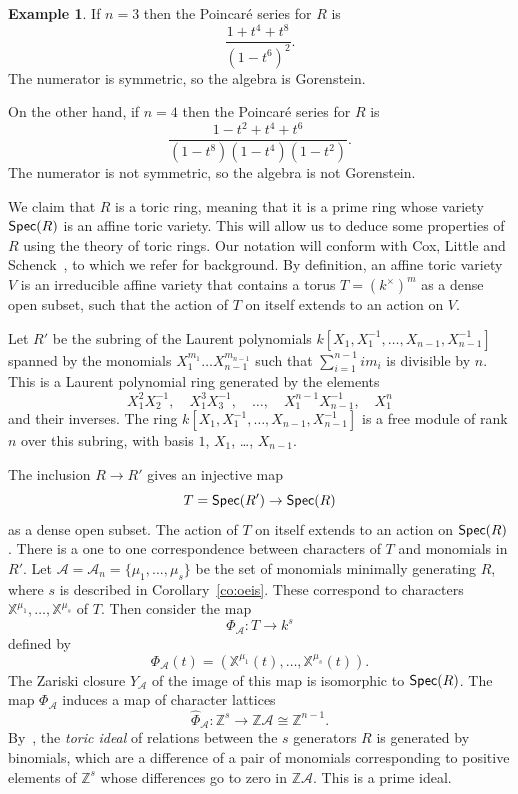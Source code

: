 \documentclass[12pt]{amsart}
\newcommand{\Spec}{\operatorname{\sf Spec}}
\newcommand{\bX}{\mathbb{X}}
\newcommand{\bZ}{{\mathbb{Z}}}
\newcommand{\mcA}{\mathcal{A}}
\numberwithin{equation}{section}
\theoremstyle{definition}
\newtheorem{example}[equation]{Example}
\begin{document}
\begin{example}
If $n=3$ then the Poincar\'e series for $R$ is
\[ \frac{1+t^4+t^8}{(1-t^6)^2}. \]
The numerator is symmetric, so the algebra is Gorenstein. 

On the other
hand, if $n=4$ then the Poincar\'e series for $R$ is
\[ \frac{1-t^2+t^4+t^6}{(1-t^8)(1-t^4)(1-t^2)}. \]
The numerator is not symmetric, so the algebra is not Gorenstein.
\end{example}

We claim that $R$ is a toric ring, meaning that it is a prime ring
whose variety $\Spec(R)$ is an affine toric variety. This will allow
us to deduce some properties of $R$ using the theory of toric
rings. Our notation will conform with Cox, Little
and Schenck~\cite{Cox/Little/Schenck:2011a}, to which we refer for
background. By definition, an 
affine toric variety $V$ is an irreducible affine variety that
contains a torus $T=(k^\times)^m$ as a dense open subset, such that
the action of $T$ on itself extends to an action on $V$.

Let $R'$ be the subring of the Laurent polynomials
$k[X_1,X_1^{-1},\dots,X_{n-1},X_{n-1}^{-1}]$ spanned by the monomials
$X_1^{m_1}\dots X_{n-1}^{m_{n-1}}$ such that $\sum_{i=1}^{n-1}im_i$ is
divisible by $n$. This is a Laurent polynomial ring generated by the
elements 
\begin{equation}
X_1^2X_2^{-1},\quad X_1^3X_3^{-1},\quad \dots,\quad
X_1^{n-1}X_{n-1}^{-1},\quad X_1^n 
\end{equation}
and their inverses. The ring
$k[X_1,X_1^{-1},\dots,X_{n-1},X_{n-1}^{-1}]$ is a free module of rank
$n$ over this subring, with basis $1$, $X_1$, \dots, $X_{n-1}$.


The inclusion $R\to R'$ gives an injective map 
\[ T=\Spec(R') \to \Spec(R) \] 
as a dense
open subset. The action of $T$ on itself extends to an action
on $\Spec(R)$.
There is a one to one correspondence between
characters of $T$ and monomials in $R'$.
Let $\mcA=\mcA_n=\{\mu_1,\dots,\mu_s\}$ be the set of monomials minimally
generating $R$, where $s$ is described in Corollary~\ref{co:oeis}. 
These correspond to characters
$\bX^{\mu_1},\dots,\bX^{\mu_s}$ of $T$.
Then consider the map 
\[ \Phi_\mcA\colon T\to k^s \]
defined by 
\[ \Phi_\mcA(t)=(\bX^{\mu_1}(t),\dots,\bX^{\mu_s}(t)). \]
The Zariski closure $Y_\mcA$ of the image of this map is isomorphic to
$\Spec(R)$. The map $\Phi_\mcA$ induces a map of character lattices 
\[ \hat\Phi_\mcA\colon \bZ^s\to \bZ\mcA\cong\bZ^{n-1}. \]
By~\cite[Proposition~1.1.9]{Cox/Little/Schenck:2011a}, the \emph{toric ideal} of
relations between the $s$ generators $R$ is generated by binomials,
which are a difference of a pair of monomials corresponding to
positive elements of $\bZ^s$ whose differences go to zero in
$\bZ\mcA$. This is a prime ideal. 
\end{document}
